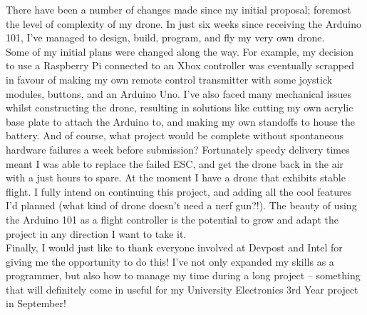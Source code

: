 \documentclass{ecsreport}      %
\begin{document}
There have been a number of changes made since my initial proposal; foremost the level of complexity of my drone. In just six weeks since receiving the Arduino 101, I’ve managed to design, build, program, and fly my very own drone. \\
Some of my initial plans were changed along the way. For example, my decision to use a Raspberry Pi connected to an Xbox controller was eventually scrapped in favour of making my own remote control transmitter with some joystick modules, buttons, and an Arduino Uno. I’ve also faced many mechanical issues whilst constructing the drone, resulting in solutions like cutting my own acrylic base plate to attach the Arduino to, and making my own standoffs to house the battery. And of course, what project would be complete without spontaneous hardware failures a week before submission? Fortunately speedy delivery times meant I was able to replace the failed ESC, and get the drone back in the air with a just hours to spare.
At the moment I have a drone that exhibits stable flight. I fully intend on continuing this project, and adding all the cool features I’d planned (what kind of drone doesn’t need a nerf gun?!). The beauty of using the Arduino 101 as a flight controller is the potential to grow and adapt the project in any direction I want to take it. \\
Finally, I would just like to thank everyone involved at Devpost and Intel for giving me the opportunity to do this! I’ve not only expanded my skills as a programmer, but also how to manage my time during a long project – something that will definitely come in useful for my University Electronics 3rd Year project in September!






	
\end{document}
